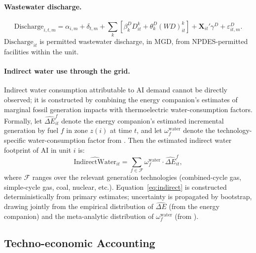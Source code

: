 \documentclass[11pt, letterpaper]{article}
\begin{document}
\paragraph{Wastewater discharge.}
\begin{equation}
\text{Discharge}_{i,t,m} = \alpha_{i,m} + \delta_{t,m} + \sum_{k} \left[\beta_k^{D} D_{it}^k + \theta_k^{D} (WD)_{it}^k\right] + \mathbf{X}_{it}'\gamma^{D} + \varepsilon^{D}_{it,m}.
\label{eq:discharge_eventstudy}
\end{equation}
$\text{Discharge}_{it}$ is permitted wastewater discharge, in MGD, from NPDES-permitted facilities within the unit.

\paragraph{Indirect water use through the grid.} Indirect water consumption attributable to AI demand cannot be directly observed; it is constructed by combining the energy companion's estimates of marginal fossil generation impacts with thermoelectric water-consumption factors. Formally, let $\widehat{\Delta E}_{it}^{f}$ denote the energy companion's estimated incremental generation by fuel $f$ in zone $z(i)$ at time $t$, and let $\omega_f^{\text{water}}$ denote the technology-specific water-consumption factor from \citet{jin2019water}. Then the estimated indirect water footprint of AI in unit $i$ is:
\begin{equation}
\widehat{\text{IndirectWater}}_{it} = \sum_{f \in \mathcal{F}} \omega_f^{\text{water}} \cdot \widehat{\Delta E}_{it}^{f},
\label{eq:indirect}
\end{equation}
where $\mathcal{F}$ ranges over the relevant generation technologies (combined-cycle gas, simple-cycle gas, coal, nuclear, etc.). Equation~\eqref{eq:indirect} is constructed deterministically from primary estimates; uncertainty is propagated by bootstrap, drawing jointly from the empirical distribution of $\widehat{\Delta E}$ (from the energy companion) and the meta-analytic distribution of $\omega_f^{\text{water}}$ (from \citealp{jin2019water}).

\subsection{Techno-economic Accounting}
\label{sec:techno}
\end{document}
